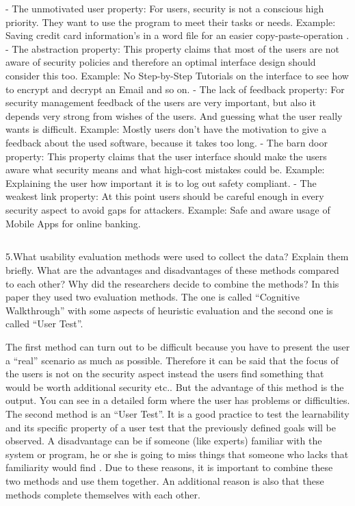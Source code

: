 -	The unmotivated user property: For users, security is not a conscious high priority. They want to use the program to meet their tasks or needs. Example: Saving credit card information’s in a word file for an easier copy-paste-operation .
-	The abstraction property: This property claims that most of the users are not aware of security policies and therefore an optimal interface design should consider this too. Example: No Step-by-Step Tutorials on the interface to see how to encrypt and decrypt an Email and so on. 
-	The lack of feedback property: For security management feedback of the users are very important, but also it depends very strong from wishes of the users. And guessing what the user really wants is difficult. Example: Mostly users don’t have the motivation to give a feedback about the used software, because it takes too long.
-	The barn door property: This property claims that the user interface should make the users aware what security means and what high-cost mistakes could be. Example: Explaining the user how important it is to log out safety compliant. 
-	The weakest link property: At this point users should be careful enough in every security aspect to avoid gaps for attackers. Example: Safe and aware usage of Mobile Apps for online banking.

\subsection{}
5.What usability evaluation methods were used to collect the data? Explain them briefly. What are the advantages and disadvantages of these methods compared to each other? Why did the researchers decide to combine the methods? 
In this paper they used two evaluation methods. The one is called “Cognitive Walkthrough” with some aspects of heuristic evaluation and the second one is called “User Test”. 

The first method can turn out to be difficult because you have to present the user a “real” scenario as much as possible. Therefore it can be said that the focus of the users is not on the security aspect instead the users find something that would be worth additional security etc.. But the advantage of this method is the output. You can see in a detailed form where the user has problems or difficulties.
The second method is an “User Test”. It is a good practice to test the learnability and its specific property of a user test that the previously defined goals will be observed. A disadvantage can be if someone (like experts) familiar with the system or program, he or she is going to miss things that someone who lacks that familiarity would find .
Due to these reasons, it is important to combine these two methods and use them together. An additional reason is also that these methods complete themselves with each other. 

